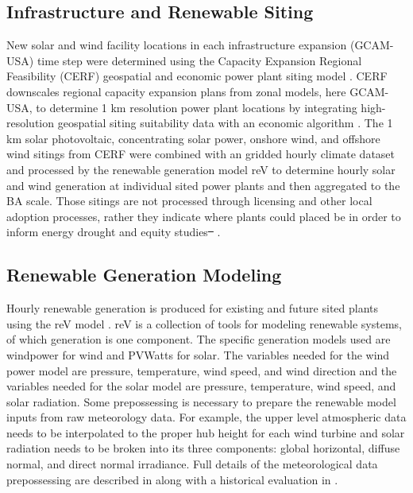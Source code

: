 \documentclass{agujournal2019}
\providecommand{\DIFdel}[1]{{\protect\color{red}\sout{#1}}} %
\providecommand{\DIFdelbegin}{} %
\providecommand{\DIFdelend}{} %
\begin{document}
\subsection{Infrastructure and Renewable Siting}
New solar and wind facility locations in each infrastructure expansion (GCAM-USA) time step were determined using the Capacity Expansion Regional Feasibility (CERF) geospatial and economic power plant siting model \cite{Vernon_2021}. CERF downscales regional capacity expansion plans from zonal models, here GCAM-USA, to determine 1 km resolution power plant locations by integrating high-resolution geospatial siting suitability data with an economic algorithm \cite{Vernon_2023,Mongird_2024}. The 1 km solar photovoltaic, concentrating solar power, onshore wind, and offshore wind sitings from CERF were combined with an gridded hourly climate dataset and processed by the renewable generation model reV to determine hourly solar and wind generation at individual sited power plants and then aggregated to the BA scale. Those sitings are not processed through licensing and other local adoption processes, rather they indicate where plants could placed be in order to inform energy drought and equity studies\DIFdelbegin \DIFdel{\mbox{%
\cite{Mongird2024}}\hskip0pt%
}\DIFdelend . 

\subsection{Renewable Generation Modeling}

Hourly renewable generation is produced for existing and future sited plants using the reV model \cite{Maclaurin2019, Buster2023}. reV is a collection of tools for modeling renewable systems, of which generation is one component. The specific generation models used are windpower \cite{windpower} for wind and PVWatts \cite{pvwatts5} for solar. The variables needed for the wind power model are pressure, temperature, wind speed, and wind direction and the variables needed for the solar model are pressure, temperature, wind speed, and solar radiation. Some prepossessing is necessary to prepare the renewable model inputs from raw meteorology data. For example, the upper level atmospheric data needs to be interpolated to the proper hub height for each wind turbine and solar radiation needs to be broken into its three components: global horizontal, diffuse normal, and direct normal irradiance. Full details of the meteorological data prepossessing are described in  along with a historical evaluation in . 
\end{document}

